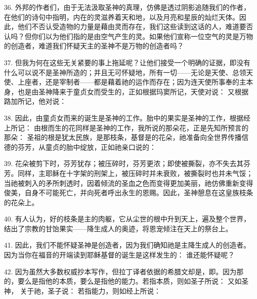 36. 外邦的作者们，由于无法汲取圣神的真理，仿佛是透过阴影追随我们的作者，在他们的诗句中指明，内在的灵滋养着天和地，以及月亮和星辰的灿烂天体。因此，他们不否认受造物的力量是藉由灵而存在，我们这些读到这话的人，难道要否认吗？但你们以为他们指的是由空气产生的灵。如果他们宣称一位空气的灵是万物的创造者，难道我们怀疑天主的圣神不是万物的创造者吗？\par

37. 但我为何在这些无关紧要的事上拖延呢？让他们接受一个明确的证据，即没有什么可以说不是圣神所造的；并且无可怀疑地，所有一切——无论是天使、总领天使、上座者，还是宰制者——都是藉着祂的运作而存在；因为连天使所事奉的主本身，也是由圣神降来于童贞女而受生的，正如根据玛窦所记，天使对说： 又根据路加所记，他对说：\par

38. 因此，由童贞女而来的诞生是圣神的工作。胎中的果实是圣神的工作，根据经上所记： 由根而生的花同样是圣神的工作，我所说的那朵花，正是先知所预言的那朵： 圣祖的根是犹太民族，是那枝条，基督是的花朵，祂准备向全世界传播信德的芬芳，从童贞的胎中绽放，正如祂亲口说的：\par

39. 花朵被剪下时，芬芳犹存；被压碎时，芬芳更浓；即使被撕裂，亦不失去其芬芳。同样，主耶稣在十字架的刑架上，被压碎时并未衰败，被撕裂时也并未气馁；当祂被刺入的矛所刺透时，因着倾流的圣血之色而变得更加美丽，祂仿佛重新变得俊美，自身不可能死亡，并向死者呼出永生的恩赐。因此，圣神憩息在这皇族枝条的花朵上。\par

40. 有人认为，好的枝条是主的肉躯，它从尘世的根中升到天上，遍及整个世界，结出了宗教的甘饴果实——降生成人的奥迹，将恩宠倾注在天上的祭台上。\par

41. 因此，我们不能怀疑圣神是创造者，因为我们确知祂是主降生成人的创造者。因为当你在福音的开端读到耶稣基督的诞生是这样发生的： 谁还能怀疑呢？\par

42. 因为虽然大多数权威抄本写作，但拉丁译者依据的希腊文却是，即。因为那的，要么是指他的本质，要么是指他的能力。若指本质，则如圣子所说： 又如圣神， 关于祂，圣子说： 若指能力，则如经上所说：\par

